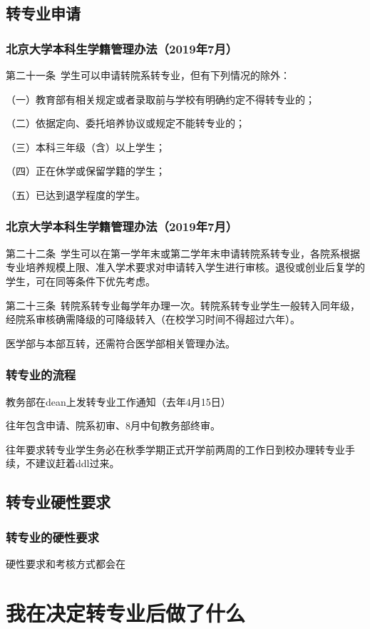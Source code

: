 \documentclass[12pt,AutoFakeBold]{beamer}
\begin{document}
    \subsection{转专业申请}
    \begin{frame}
        \frametitle{北京大学本科生学籍管理办法（2019年7月）}
        第二十一条\  学生可以申请转院系转专业，但有下列情况的除外：

        （一）教育部有相关规定或者录取前与学校有明确约定不得转专业的；

        （二）依据定向、委托培养协议或规定不能转专业的；

        （三）本科三年级（含）以上学生；

        （四）正在休学或保留学籍的学生；

        （五）已达到退学程度的学生。
    \end{frame}
    \begin{frame}
        \frametitle{北京大学本科生学籍管理办法（2019年7月）}
        第二十二条\ 学生可以在第一学年末或第二学年末申请转院系转专业，各院系根据专业培养规模上限、准入学术要求对申请转入学生进行审核。退役或创业后复学的学生，可在同等条件下优先考虑。

        第二十三条\ 转院系转专业每学年办理一次。转院系转专业学生一般转入同年级，经院系审核确需降级的可降级转入（在校学习时间不得超过六年）。

        医学部与本部互转，还需符合医学部相关管理办法。
    \end{frame}
    \begin{frame}
        \frametitle{转专业的流程}
        教务部在dean上发转专业工作通知（去年4月15日）

        往年包含申请、院系初审、8月中旬教务部终审。

        往年要求转专业学生\alert{务必}在秋季学期正式开学前\alert{两周的工作日}到校办理转专业手续，不建议赶着ddl过来。
    \end{frame}
    \subsection{转专业硬性要求}
    \begin{frame}
        \frametitle{转专业的硬性要求}
        硬性要求和考核方式都会在
    \end{frame}
    
    \section{我在决定转专业后做了什么}
\end{document}
